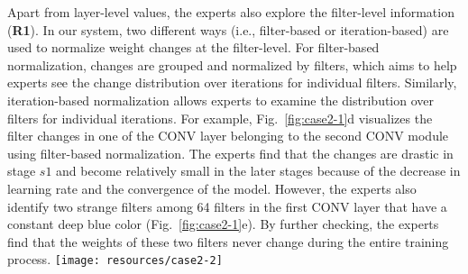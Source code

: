 \documentclass[format=acmsmall, review=false, screen=true]{acmart}
\newcommand{\dy}{\textcolor[rgb]{0,0,0}}
\begin{document}
Apart from layer-level values, the experts also explore the filter-level information (\textbf{R1}).
In our system, two different ways (i.e., filter-based or iteration-based) are used to normalize weight changes at the filter-level.
For filter-based normalization, changes are grouped and normalized by filters, which aims to help experts see the change distribution over iterations for individual filters.
Similarly, iteration-based normalization allows experts to examine the distribution over filters for individual iterations.
For example, Fig.~\ref{fig:case2-1}d visualizes the filter changes in one of the CONV layer belonging to the second CONV module using filter-based normalization.
The experts find that the changes are drastic in stage $s1$ and become relatively small in the later stages because of the decrease in learning rate and the convergence of the model.
However, the experts also identify two strange filters among 64 filters in the first CONV layer that have a constant deep blue color (Fig.~\ref{fig:case2-1}e).
By further checking, the experts find that the weights of these two filters never change during the entire training process.
	\centering
	\texttt{[image: resources/case2-2]}
\end{document}
